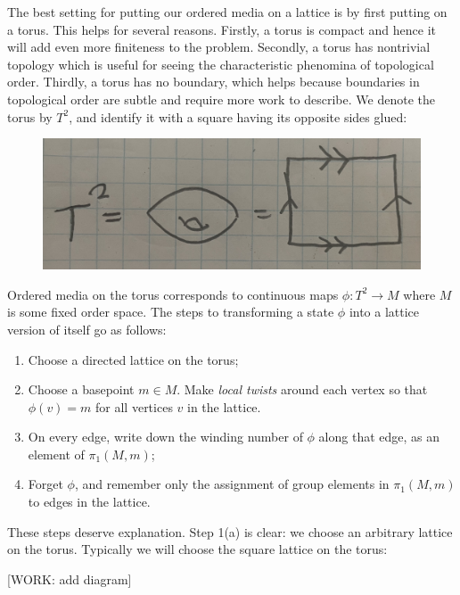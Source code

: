 \documentclass{article}
\theoremstyle{definition}
\numberwithin{figure}{section}
\begin{document}
The best setting for putting our ordered media on a lattice is by first putting on a torus. This helps for several reasons. Firstly, a torus is compact and hence it will add even more finiteness to the problem. Secondly, a torus has nontrivial topology which is useful for seeing the characteristic phenomina of topological order. Thirdly, a torus has no boundary, which helps because boundaries in topological order are subtle and require more work to describe. We denote the torus by $T^2$, and identify it with a square having its opposite sides glued:

\begin{figure}[h]
\begin{center}
\includegraphics[scale=.04]{torus-definition}
\end{center}
\end{figure}

Ordered media on the torus corresponds to continuous maps $\phi: T^2\to M$ where $M$ is some fixed order space. The steps to transforming a state $\phi$ into a lattice version of itself go as follows:

\begin{enumerate}
\item Choose a directed lattice on the torus;
\item Choose a basepoint $m\in M$. Make \textit{local twists} around each vertex so that $\phi(v)=m$ for all vertices $v$ in the lattice.
\item On every edge, write down the winding number of $\phi$ along that edge, as an element of $\pi_1(M,m)$;
\item Forget $\phi$, and remember only the assignment of group elements in $\pi_1(M,m)$ to edges in the lattice.
\end{enumerate}

These steps deserve explanation. Step 1(a) is clear: we choose an arbitrary lattice on the torus. Typically we will choose the square lattice on the torus:

[WORK: add diagram]
\end{document}
